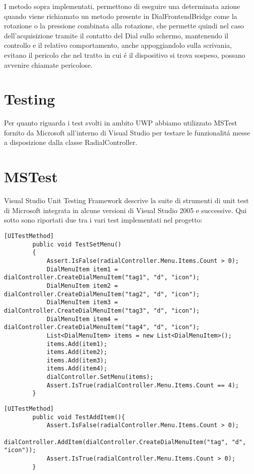 I metodo sopra implementati, permettono di eseguire una determinata azione quando viene richiamato un metodo presente in DialFrontendBridge come la rotazione o la pressione combinata alla rotazione, che permette quindi nel caso dell'acquisizione tramite il contatto del Dial sullo schermo, mantenendo il controllo e il relativo comportamento, anche appoggiandolo sulla scrivania, evitano il pericolo che nel tratto in cui é il dispositivo si trova sospeso, possano avvenire chiamate pericolose.

\section{Testing}

Per quanto riguarda i test svolti in ambito UWP abbiamo utilizzato MSTest fornito da Microsoft all’interno di Visual Studio per testare le funzionalitá messe a disposizione dalla classe RadialController.

\section{MSTest}
Visual Studio Unit Testing Framework descrive la suite di strumenti di unit test di Microsoft integrata in alcune versioni di Visual Studio 2005 e successive.
Qui sotto sono riportati due tra i vari test implementati nel progetto:
 
\vspace{1.0cm}
\begin{lstlisting}[caption={Test SetMenu},style=javaScriptCode]
    [UITestMethod]
        public void TestSetMenu()
        {
            Assert.IsFalse(radialController.Menu.Items.Count > 0);
            DialMenuItem item1 = dialController.CreateDialMenuItem("tag1", "d", "icon");
            DialMenuItem item2 = dialController.CreateDialMenuItem("tag2", "d", "icon");
            DialMenuItem item3 = dialController.CreateDialMenuItem("tag3", "d", "icon");
            DialMenuItem item4 = dialController.CreateDialMenuItem("tag4", "d", "icon");
            List<DialMenuItem> items = new List<DialMenuItem>();
            items.Add(item1);
            items.Add(item2);
            items.Add(item3);
            items.Add(item4);
            dialController.SetMenu(items);
            Assert.IsTrue(radialController.Menu.Items.Count == 4);
        }
\end{lstlisting} 
\vspace{1.0cm}

\vspace{1.0cm}
\begin{lstlisting}[caption={Test aggiunta voce di Menu'},style=javaScriptCode]
  [UITestMethod]
        public void TestAddItem(){
            Assert.IsFalse(radialController.Menu.Items.Count > 0);
            dialController.AddItem(dialController.CreateDialMenuItem("tag", "d", "icon"));
            Assert.IsTrue(radialController.Menu.Items.Count > 0);
        }
\end{lstlisting} 
\vspace{1.0cm}
